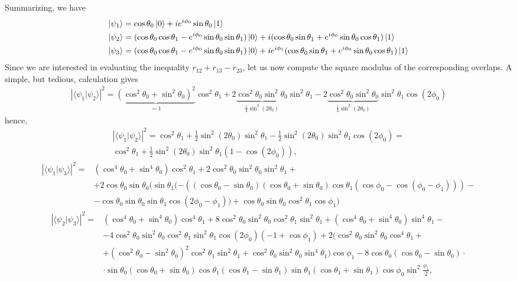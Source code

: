 \documentclass[a4paper,twocolumn,11pt,accepted=2024-01-17]{quantumarticle}
\begin{document}
Summarizing, we have
\begin{align*}
    \ket{\psi_1}&= \cos\theta_0 \ket{0} + ie^{i\phi_0}\sin\theta_0\ket{1}\\
    \ket{\psi_2}&=(\cos\theta_0\cos\theta_1-e^{i\phi_0}\sin\theta_0\sin\theta_1)\ket{0}+i(\cos\theta_0\sin\theta_1+e^{i\phi_0}\sin\theta_0\cos\theta_1)\ket{1}\\
    \ket{\psi_3}&=(\cos\theta_0\cos\theta_1-e^{i\phi_0}\sin\theta_0\sin\theta_1)\ket{0}+ie^{i\phi_1}(\cos\theta_0\sin\theta_1+e^{i\phi_0}\sin\theta_0\cos\theta_1)\ket{1}
\end{align*}
Since we are interested in evaluating the inequality $r_{12}+r_{13}-r_{23}$, let us now compute the square modulus of the corresponding overlaps. A simple, but tedious, calculation gives
\begin{align*}
    |\langle \psi_1\vert \psi_2 \rangle|^2 = \underbrace{(\cos^2\theta_0 + \sin^2\theta_0)^2}_{=1} \cos^2\theta_1 + 2 \underbrace{\cos^2\theta_0 \sin^2\theta_0}_{\frac{1}{4}\sin^2(2\theta_0)} \sin^2\theta_1 - 2 \underbrace{\cos^2\theta_0 \sin^2\theta_0}_{\frac{1}{4}\sin^2(2\theta_0)} \sin^2\theta_1 \cos(2\phi_0)
\end{align*}
hence,
\begin{align*}
    |\langle \psi_1\vert \psi_2 \rangle|^2 =  \cos^2\theta_1 + \frac{1}{2} \sin^2(2\theta_0) \sin^2\theta_1 - \frac{1}{2} \sin^2(2\theta_0) \sin^2\theta_1 \cos(2\phi_0)=\\\cos^2\theta_1+\frac{1}{2} \sin^2(2\theta_0) \sin^2\theta_1(1-\cos(2\phi_0)),
\end{align*}
\begin{align*}
    |\langle\psi_1\vert\psi_3\rangle|^2 = &(\cos^4\theta_0 + \sin^4\theta_0)\cos^2\theta_1 + 2 \cos^2\theta_0 \sin^2\theta_0 \sin^2\theta_1 +\\
    &+2\cos\theta_0 \sin\theta_0 (\sin\theta_1 (-((\cos\theta_0 - \sin\theta_0)(\cos\theta_0 + \sin\theta_0)\cos\theta_1
    (\cos\phi_0 - \cos(\phi_0 - \phi_1))) -\\
    &-\cos\theta_0 \sin\theta_0 \sin\theta_1 \cos(2\phi_0 - \phi_1)) + \cos\theta_0 \sin\theta_0 \cos^2\theta_1 \cos\phi_1)
\end{align*}
\begin{align*}
     |\langle\psi_2 \vert \psi_3 \rangle |^2 =& (\cos^4\theta_0 + \sin^4\theta_0) \cos^4\theta_1 + 8 \cos^2\theta_0 \sin^2\theta_0 \cos^2\theta_1 \sin^2\theta_1 +(\cos^4\theta_0 + \sin^4\theta_0) \sin^4\theta_1 -\\
     & -4 \cos^2\theta_0 \sin^2\theta_0 \cos^2\theta_1 \sin^2\theta_1 \cos(2\phi_0) (-1 + \cos\phi_1) + 2 (\cos^2\theta_0 \sin^2\theta_0 \cos^4\theta_1 +\\
     &+ (\cos^2\theta_0 - \sin^2\theta_0)^2 \cos^2\theta_1 \sin^2\theta_1+ \cos^2\theta_0 \sin^2\theta_0 \sin^4\theta_1) \cos\phi_1 - 8 \cos\theta_0 (\cos\theta_0 - \sin\theta_0)\cdot\\
     &\cdot\sin\theta_0 (\cos\theta_0 + \sin\theta_0) \cos\theta_1 (\cos\theta_1 - \sin\theta_1) \sin\theta_1 (\cos\theta_1 + \sin\theta_1) \cos\phi_0 \sin^2\frac{\phi_1}{2},
\end{align*}
\end{document}
